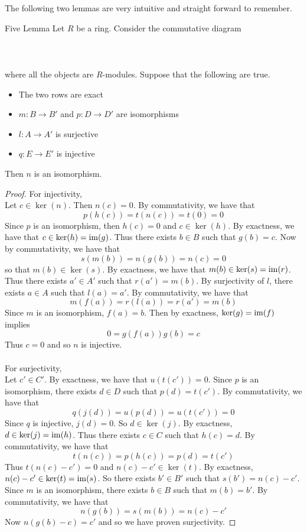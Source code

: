 \documentclass[a4paper]{article}
\begin{document}
The following two lemmas are very intuitive and straight forward to remember. 

\begin{lmm}{Five Lemma}{} Let $R$ be a ring. Consider the commutative diagram \\~\\
\\~\\
where all the objects are $R$-modules. Suppose that the following are true. 
\begin{itemize}
\item The two rows are exact
\item $m:B\to B'$ and $p:D\to D'$ are isomorphisms
\item $l:A\to A'$ is surjective
\item $q:E\to E'$ is injective
\end{itemize}
Then $n$ is an isomorphism. \tcbline
\begin{proof}
For injectivity, \\
Let $c\in\ker(n)$. Then $n(c)=0$. By commutativity, we have that $$p(h(c))=t(n(c))=t(0)=0$$ Since $p$ is an isomorphism, then $h(c)=0$ and $c\in\ker(h)$. By exactness, we have that $c\in\ker(h)=\operatorname{im}(g)$. Thus there exists $b\in B$ such that $g(b)=c$. Now by commutativity, we have that $$s(m(b))=n(g(b))=n(c)=0$$ so that $m(b)\in\ker(s)$. By exactness, we have that $m(b)\in\ker(s)=\operatorname{im}(r)$. Thus there exists $a'\in A'$ such that $r(a')=m(b)$. By surjectivity of $l$, there exists $a\in A$ such that $l(a)=a'$. By commutativity, we have that $$m(f(a))=r(l(a))=r(a')=m(b)$$ Since $m$ is an isomorphism, $f(a)=b$. Then by exactness, $\ker(g)=\operatorname{im}(f)$ implies $$0=g(f(a))g(b)=c$$ Thus $c=0$ and so $n$ is injective. \\~\\

For surjectivity, \\
Let $c'\in C'$. By exactness, we have that $u(t(c'))=0$. Since $p$ is an isomorphism, there exists $d\in D$ such that $p(d)=t(c')$. By commutativity, we have that $$q(j(d))=u(p(d))=u(t(c'))=0$$ Since $q$ is injective, $j(d)=0$. So $d\in\ker(j)$. By exactness, $d\in\ker(j)=\operatorname{im}(h)$. Thus there exists $c\in C$ such that $h(c)=d$. By commutativity, we have that $$t(n(c))=p(h(c))=p(d)=t(c')$$ Thus $t(n(c)-c')=0$ and $n(c)-c'\in\ker(t)$. By exactness, $n(c)-c'\in\ker(t)=\operatorname{im}(s)$. So there exists $b'\in B'$ such that $s(b')=n(c)-c'$. Since $m$ is an isomorphism, there exists $b\in B$ such that $m(b)=b'$. By commutativity, we have that $$n(g(b))=s(m(b))=n(c)-c'$$ Now $n(g(b)-c)=c'$ and so we have proven surjectivity. 
\end{proof}
\end{lmm}
\end{document}
